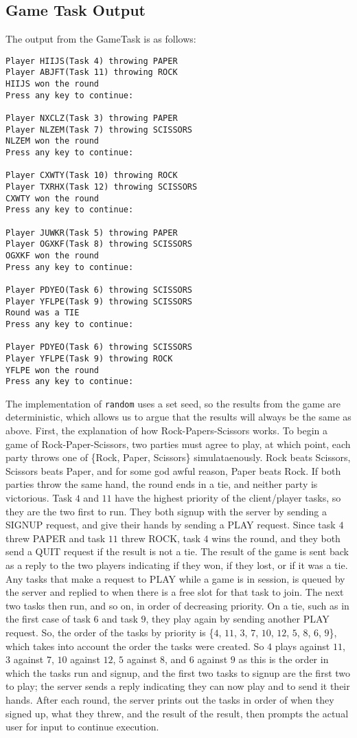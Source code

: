 \documentclass[12pt]{article}
\begin{document}
\subsection{Game Task Output}
The output from the GameTask is as follows:
\begin{verbatim}
Player HIIJS(Task 4) throwing PAPER
Player ABJFT(Task 11) throwing ROCK
HIIJS won the round
Press any key to continue:

Player NXCLZ(Task 3) throwing PAPER
Player NLZEM(Task 7) throwing SCISSORS
NLZEM won the round
Press any key to continue:

Player CXWTY(Task 10) throwing ROCK
Player TXRHX(Task 12) throwing SCISSORS
CXWTY won the round
Press any key to continue:

Player JUWKR(Task 5) throwing PAPER
Player OGXKF(Task 8) throwing SCISSORS
OGXKF won the round
Press any key to continue:

Player PDYEO(Task 6) throwing SCISSORS
Player YFLPE(Task 9) throwing SCISSORS
Round was a TIE
Press any key to continue:

Player PDYEO(Task 6) throwing SCISSORS
Player YFLPE(Task 9) throwing ROCK
YFLPE won the round
Press any key to continue:
\end{verbatim}
The implementation of \texttt{random} uses a set seed, so the results from the game are deterministic, which allows us to argue that the results will always be the same as above.  First, the explanation of how Rock-Papers-Scissors works.  To begin a game of Rock-Paper-Scissors, two parties must agree to play, at which point, each party throws one of \{Rock, Paper, Scissors\} simulataenously.  Rock beats Scissors, Scissors beats Paper, and for some god awful reason, Paper beats Rock.  If both parties throw the same hand, the round ends in a tie, and neither party is victorious.  Task $4$ and $11$ have the highest priority of the client/player tasks, so they are the two first to run.  They both signup with the server by sending a SIGNUP request, and give their hands by sending a PLAY request.  Since task $4$ threw PAPER and task $11$ threw ROCK, task $4$ wins the round, and they both send a QUIT request if the result is not a tie.  The result of the game is sent back as a reply to the two players indicating if they won, if they lost, or if it was a tie.  Any tasks that make a request to PLAY while a game is in session, is queued by the server and replied to when there is a free slot for that task to join.  The next two tasks then run, and so on, in order of decreasing priority.  On a tie, such as in the first case of task $6$ and task $9$, they play again by sending another PLAY request.  So, the order of the tasks by priority is \{$4$, $11$, $3$, $7$, $10$, $12$, $5$, $8$, $6$, $9$\}, which takes into account the order the tasks were created.  So $4$ plays against $11$, $3$ against $7$, $10$ against $12$, $5$ against $8$, and $6$ against $9$ as this is the order in which the tasks run and signup, and the first two tasks to signup are the first two to play; the server sends a reply indicating they can now play and to send it their hands.  After each round, the server prints out the tasks in order of when they signed up, what they threw, and the result of the result, then prompts the actual user for input to continue execution.
\end{document}
